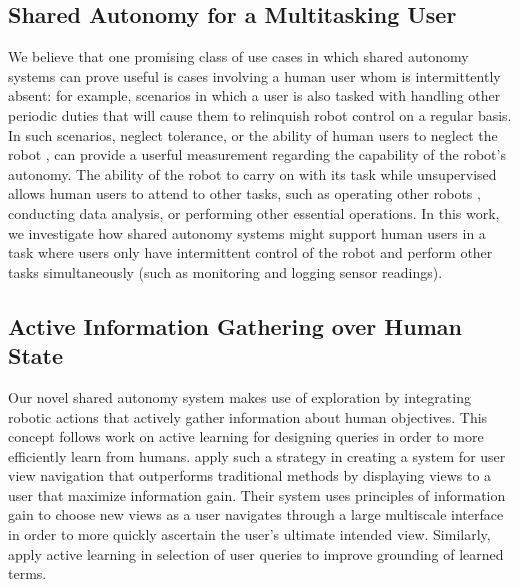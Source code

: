 \documentclass[conference]{IEEEtran}
\begin{document}
\subsection{Shared Autonomy for a Multitasking User}
We believe that one promising class of use cases in which shared autonomy systems can prove useful is cases involving a human user whom is intermittently absent: for example, scenarios in which a user is also tasked with handling other periodic duties that will cause them to relinquish robot control on a regular basis. In such scenarios, neglect tolerance, or the ability of human users to neglect the robot \cite{crandall2002characterizing, olsen2003metrics}, can provide a userful measurement regarding the capability of the robot's autonomy. The ability of the robot to carry on with its task while unsupervised allows human users to attend to other tasks, such as operating other robots \cite{crandall2005validating, cummings2008predicting}, conducting data analysis, or performing other essential operations. In this work, we investigate how shared autonomy systems might support human users in a task where users only have intermittent control of the robot and perform other tasks simultaneously (such as monitoring and logging sensor readings). 

\subsection{Active Information Gathering over Human State}
Our novel shared autonomy system makes use of exploration by integrating robotic actions that actively gather information about human objectives. This concept follows work on active learning for designing queries in order to more efficiently learn from humans. \citet{liu2017bignav} apply such a strategy in creating a system for user view navigation that outperforms traditional methods by displaying views to a user that maximize information gain. Their system uses principles of information gain to choose new views as a user navigates through a large multiscale interface in order to more quickly ascertain the user's ultimate intended view. Similarly, \citet{thomason2017opportunistic} apply active learning in selection of user queries to improve grounding of learned terms.
\end{document}
